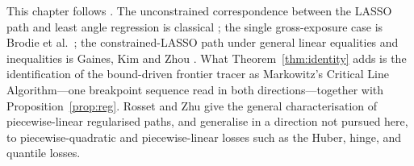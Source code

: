\begin{notes}
This chapter follows \cite{schmelzer2026perspective}. The unconstrained
correspondence between the LASSO path and least angle regression is classical
\cite{efron2004}; the single gross-exposure case is Brodie et al.\ \cite{brodie2009};
the constrained-LASSO path under general linear equalities and inequalities is Gaines,
Kim and Zhou \cite{gaines2018}. What Theorem~\ref{thm:identity} adds is the
identification of the bound-driven frontier tracer as Markowitz's Critical Line
Algorithm---one breakpoint sequence read in both directions---together with
Proposition~\ref{prop:reg}. Rosset and Zhu \cite{rosset2007} give the general
characterisation of piecewise-linear regularised paths, and generalise in a direction
not pursued here, to piecewise-quadratic and piecewise-linear losses such as the
Huber, hinge, and quantile losses.
\end{notes}

